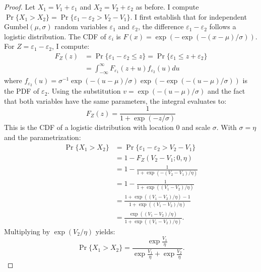 \documentclass[12pt]{article}
\theoremstyle{plain}
\begin{document}
\begin{proof}
	Let $X_1 = V_1 + \varepsilon_1$ and $X_2 = V_2 + \varepsilon_2$ as before. I compute $\Pr\{X_1 > X_2\} = \Pr\{\varepsilon_1 - \varepsilon_2 > V_2 - V_1\}$. I first establish that for independent Gumbel$(\mu, \sigma)$ random variables
	$\varepsilon_1$ and $\varepsilon_2$, the difference $\varepsilon_1 -
		\varepsilon_2$ follows a logistic distribution. The CDF of $\varepsilon_i$ is
	$F(x) = \exp(-\exp(-(x-\mu)/\sigma))$. For $Z = \varepsilon_1 - \varepsilon_2$,
	I compute:
	\begin{align*}
		F_Z(z) & = \Pr\{\varepsilon_1 - \varepsilon_2 \leq z\} = \Pr\{\varepsilon_1 \leq z + \varepsilon_2\} \\
		       & = \int_{-\infty}^{\infty} F_{\varepsilon_1}(z + u) f_{\varepsilon_2}(u) du
	\end{align*}
	where $f_{\varepsilon_2}(u) = \sigma^{-1}\exp(-(u-\mu)/\sigma)\exp(-\exp(-(u-\mu)/\sigma))$ is the PDF of $\varepsilon_2$. Using the substitution $v = \exp(-(u-\mu)/\sigma)$ and the fact that both variables have the same parameters, the integral evaluates to:
	\begin{equation*}
		F_Z(z) = \frac{1}{1 + \exp(-z/\sigma)}
	\end{equation*}
This is the CDF of a logistic distribution with location 0 and scale $\sigma$.	With $\sigma = \eta$ and the parametrization:
	\begin{align*}
		\Pr\{X_1 > X_2\} & = \Pr\{\varepsilon_1 - \varepsilon_2 > V_2 - V_1\}                  \\
		                 & = 1 - F_{Z}(V_2 - V_1; 0, \eta)                                     \\
		                 & = 1 - \frac{1}{1 + \exp(-(V_2 - V_1)/\eta)}                         \\
		                 & = 1 - \frac{1}{1 + \exp((V_1 - V_2)/\eta)}                          \\
		                 & = \frac{1 + \exp((V_1 - V_2)/\eta) - 1}{1 + \exp((V_1 - V_2)/\eta)} \\
		                 & = \frac{\exp((V_1 - V_2)/\eta)}{1 + \exp((V_1 - V_2)/\eta)}.
	\end{align*}
	Multiplying by $\exp(V_2/\eta)$ yields:
	\begin{equation*}
		\Pr\{X_1 > X_2\} = \frac{\exp\frac{V_1}{\eta}}{\exp\frac{V_1}{\eta} + \exp\frac{V_2}{\eta}}.
	\end{equation*}
\end{proof}
\end{document}

